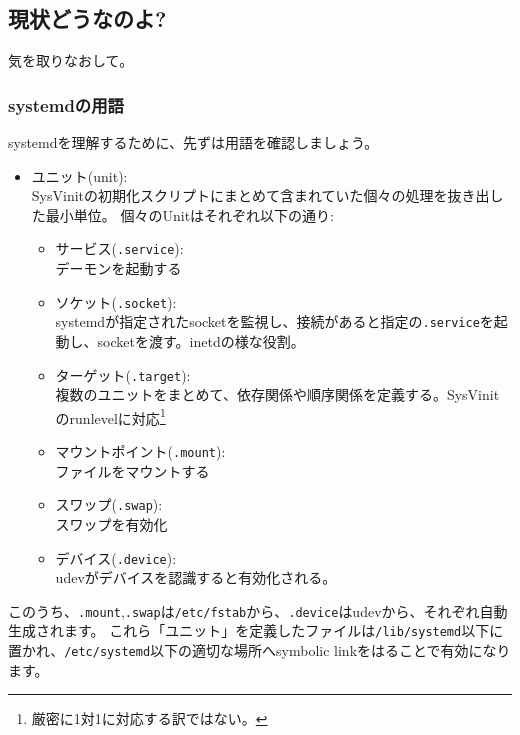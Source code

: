 \documentclass[mingoth,a4paper]{jsarticle}
\begin{document}
\subsection{現状どうなのよ?}

気を取りなおして。

\subsubsection{systemdの用語}
systemdを理解するために、先ずは用語を確認しましょう。
\begin{itemize}
\item ユニット(unit): \\
  SysVinitの初期化スクリプトにまとめて含まれていた個々の処理を抜き出した最小単位。
  個々のUnitはそれぞれ以下の通り:
  \begin{itemize}
  \item サービス(\texttt{.service}): \\
    デーモンを起動する
  \item ソケット(\texttt{.socket}): \\
    systemdが指定されたsocketを監視し、接続があると指定の\texttt{.service}を起動し、socketを渡す。inetdの様な役割。
  \item ターゲット(\texttt{.target}):\\
    複数のユニットをまとめて、依存関係や順序関係を定義する。SysVinitのrunlevelに対応\footnote{%
      厳密に1対1に対応する訳ではない。%
    }
  \item マウントポイント(\texttt{.mount}): \\
    ファイルをマウントする
  \item スワップ(\texttt{.swap}): \\
    スワップを有効化
  \item デバイス(\texttt{.device}): \\
    udevがデバイスを認識すると有効化される。
  \end{itemize}
\end{itemize}
このうち、\texttt{.mount},\texttt{.swap}は\texttt{/etc/fstab}から、\texttt{.device}はudevから、それぞれ自動生成されます。
これら「ユニット」を定義したファイルは\texttt{/lib/systemd}以下に置かれ、\texttt{/etc/systemd}以下の適切な場所へsymbolic linkをはることで有効になります。
\end{document}
